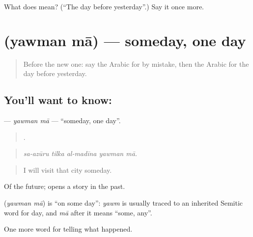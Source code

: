 \begin{tcolorbox}[breakable,colback=teal!4,colframe=teal!35!black,title={Before you move on}]
What does   mean? (\textquotedblleft{}The day before yesterday\textquotedblright{}.) Say it once more.
\end{tcolorbox}
\section[\texorpdfstring{\ar{يوما} \ar{ما} (yawman mā)}{يوما ما (yawman mā)}]{  (yawman mā) — someday, one day}

\label{lesson:AR-C349-yawman-ma}



\begin{quote}
Before the new one: say the Arabic for by mistake, then the Arabic for the day before yesterday.
\end{quote}

\subsection*{You'll want to know:  }
\textbf{ } — \emph{yawman mā} — \textquotedblleft{}someday, one day\textquotedblright{}.

\begin{quote}
    .
\end{quote}

\begin{quote}
\emph{sa-azūru tilka al-madīna yawman mā.}
\end{quote}

\begin{quote}
I will visit that city someday.
\end{quote}

Of the future;   opens a story in the past.

\begin{cousinweb}
\textbf{ } (\emph{yawman mā}) is \textquotedblleft{}on some day\textquotedblright{}: \emph{yawm} is usually traced to an inherited Semitic word for day, and \emph{mā} after it means \textquotedblleft{}some, any\textquotedblright{}.
\end{cousinweb}

\begin{grammarlens}[title={What you've built}]
One more word for telling what happened.
\end{grammarlens}

